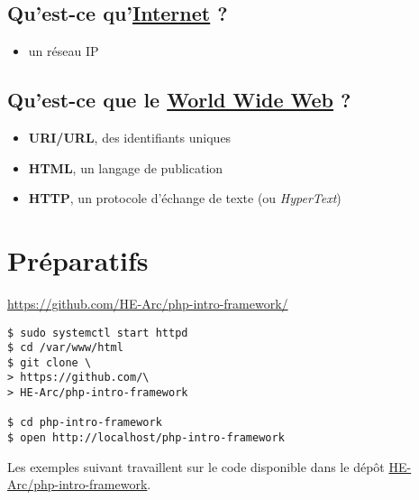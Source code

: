 \hypertarget{quest-ce-quinternetitcrowd}{%
\subsection{\texorpdfstring{Qu'est-ce
qu'\href{https://www.youtube.com/watch?v=iDbyYGrswtg}{Internet}
?}{Qu'est-ce qu'Internet ?}}\label{quest-ce-quinternetitcrowd}}

\begin{itemize}
\tightlist
\item
  un réseau IP
\end{itemize}

\hypertarget{quest-ce-que-le-world-wide-webcern}{%
\subsection{\texorpdfstring{Qu'est-ce que le
\href{http://line-mode.cern.ch/www/hypertext/WWW/TheProject.html\%5E}{World
Wide Web}
?}{Qu'est-ce que le World Wide Web ?}}\label{quest-ce-que-le-world-wide-webcern}}

\begin{itemize}
\tightlist
\item
  \textbf{URI/URL}, des identifiants uniques
\item
  \textbf{HTML}, un langage de publication
\item
  \textbf{HTTP}, un protocole d'échange de texte (ou \emph{HyperText})
\end{itemize}

\hypertarget{pruxe9paratifs}{%
\section{Préparatifs}\label{pruxe9paratifs}}

\href{https://github.com/HE-Arc/php-intro-framework}{https://github.com/HE-Arc/php-intro-framework/}

\begin{otherlanguage}{english}

\begin{verbatim}
$ sudo systemctl start httpd
$ cd /var/www/html
$ git clone \
> https://github.com/\
> HE-Arc/php-intro-framework

$ cd php-intro-framework
$ open http://localhost/php-intro-framework
\end{verbatim}

\end{otherlanguage}

Les exemples suivant travaillent sur le code disponible dans le dépôt
\href{https://github.com/HE-Arc/php-intro-framework}{HE-Arc/php-intro-framework}.

